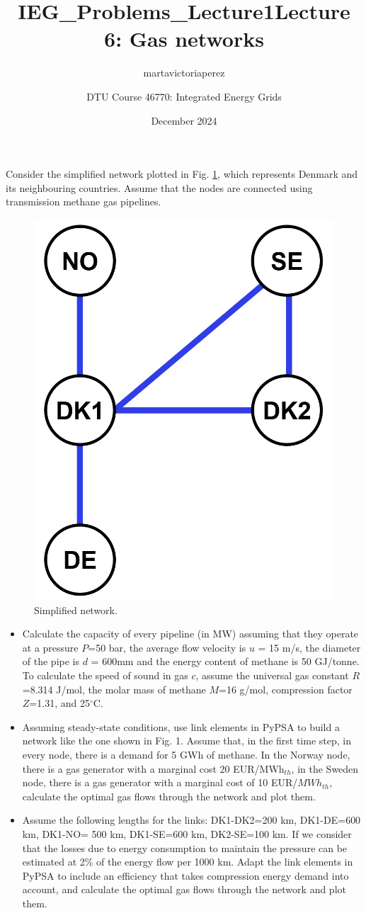 \documentclass[10pt]{article}
\title{IEG_Problems_Lecture1}
\author{martavictoriaperez }
\date{December 2024}
\newenvironment{problem}[2][Problem]{\begin{trivlist}
\item[\hskip \labelsep {\bfseries #1}\hskip \labelsep {\bfseries #2.}]}{\end{trivlist}}
\begin{document}
 
\title{\textbf{Lecture 6: Gas networks}}
\author{
DTU Course 46770: Integrated Energy Grids }
\maketitle

\begin{problem}{6.1}

Consider the simplified network plotted in Fig. \ref{fig_network}, which represents Denmark and its neighbouring countries. Assume that the nodes are connected using transmission methane gas pipelines.


\begin{figure}
    \centering
    \includegraphics[width=0.2\linewidth]{figures/nodes.jpg}
    \caption{Simplified network.}
    \label{fig_network}
\end{figure}
\begin{itemize}

\item[a)] Calculate the capacity of every pipeline (in MW) assuming that they operate at a pressure $P$=50 bar, the average flow velocity is $u$ = 15 m/s, the diameter of the pipe is $d$ = 600mm and the energy content of methane is 50 GJ/tonne. To calculate the speed of sound in gas $c$, assume the universal gas constant $R$=8.314 J/mol, the molar mass of methane $M$=16 g/mol, compression factor $Z$=1.31, and 25$^{\circ}$C.

\item[b)] Assuming steady-state conditions, use link elements in PyPSA to build a network like the one shown in Fig. 1.  Assume that, in the first time step,  in every node, there is a demand for 5 GWh of methane.  In the Norway node, there is a gas generator with a marginal cost 20 EUR/MWh$_{th}$, in the Sweden node, there is a gas generator with a marginal cost of 10 EUR/$MWh_{th}$, calculate the optimal gas flows through the network and plot them. 

\item[c)] Assume the following lengths for the links: DK1-DK2=200 km, DK1-DE=600 km, DK1-NO= 500 km, DK1-SE=600 km, DK2-SE=100 km. If we consider that the losses due to energy consumption to maintain the pressure can be estimated at 2\% of the energy flow per 1000 km. Adapt the link elements in PyPSA to include an efficiency that takes compression energy demand into account, and calculate the optimal gas flows through the network and plot them.


\end{itemize}
\end{problem}
\end{document}
